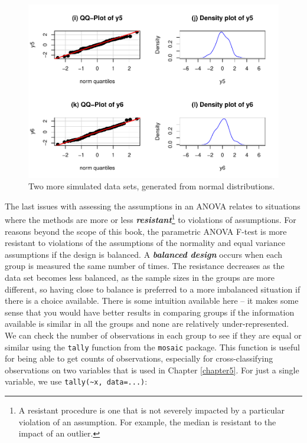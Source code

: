 \documentclass[]{book}
\let\rmarkdownfootnote\footnote%
\def\footnote{\protect\rmarkdownfootnote}
\theoremstyle{definition}
\theoremstyle{definition}
\theoremstyle{remark}
\begin{document}
\begin{figure}
\centering
\includegraphics{03-oneWayAnova_files/figure-latex/Figure3-13-1.pdf}
\caption{\label{fig:Figure3-13}Two more simulated data sets, generated from normal
distributions.}
\end{figure}

The last issues with assessing the assumptions in an ANOVA relates to
situations where the methods are more or less
\textbf{\emph{resistant}}\footnote{A resistant procedure is one that is
  not severely impacted by a particular violation of an assumption. For
  example, the median is resistant to the impact of an outlier.} to
violations of assumptions. For reasons beyond the scope of this book,
the parametric ANOVA F-test is more resistant to violations of the
assumptions of the normality and equal variance assumptions if the
design is balanced. A \textbf{\emph{balanced design}} occurs when each
group is measured the same number of times. The resistance decreases as
the data set becomes less balanced, as the sample sizes in the groups
are more different, so having close to balance is preferred to a more
imbalanced situation if there is a choice available. There is some
intuition available here -- it makes some sense that you would have
better results in comparing groups if the information available is
similar in all the groups and none are relatively under-represented. We
can check the number of observations in each group to see if they are
equal or similar using the \texttt{tally} function from the
\texttt{mosaic} package. This function is useful for being able to get
counts of observations, especially for cross-classifying observations on
two variables that is used in Chapter \ref{chapter5}. For just a single
variable, we use \texttt{tally(\textasciitilde{}x,\ data=...)}:
\end{document}
